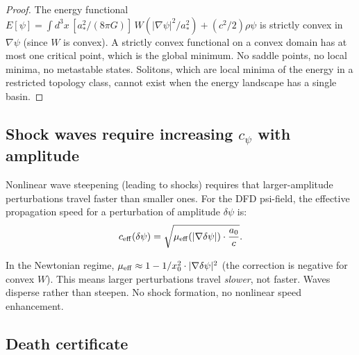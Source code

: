 \documentclass[11pt]{article}
\begin{document}
\begin{proof}
The energy functional $E[\psi] = \int d^3x\,[a_*^2/(8\pi G)]\,W(|\nabla\psi|^2/a_*^2)
+ (c^2/2)\rho\psi$ is strictly convex in $\nabla\psi$ (since $W$ is convex).
A strictly convex functional on a convex domain has at most one critical
point, which is the global minimum. No saddle points, no local minima,
no metastable states. Solitons, which are local minima of the energy in
a restricted topology class, cannot exist when the energy landscape has
a single basin.
\end{proof}

\subsection{Shock waves require increasing $c_\psi$ with amplitude}

Nonlinear wave steepening (leading to shocks) requires that larger-amplitude
perturbations travel faster than smaller ones. For the DFD psi-field, the
effective propagation speed for a perturbation of amplitude $\delta\psi$ is:
\begin{equation}
c_{\rm eff}(\delta\psi) = \sqrt{\mu_{\rm eff}(|\nabla\delta\psi|) \cdot \frac{a_0}{c}}.
\end{equation}

In the Newtonian regime, $\mu_{\rm eff} \approx 1 - 1/x_0^2 \cdot |\nabla\delta\psi|^2$
(the correction is negative for convex $W$). This means larger perturbations
travel \emph{slower}, not faster. Waves disperse rather than steepen.
No shock formation, no nonlinear speed enhancement.

\subsection{Death certificate}
\end{document}
